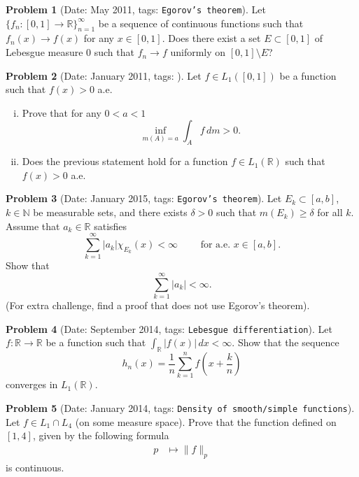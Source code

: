 \documentclass[11pt, notitlepage]{article}
\theoremstyle{definition}
\theoremstyle{definition}
\theoremstyle{definition}
\newtheorem{probstate}{Problem}
\theoremstyle{remark}
\newenvironment{problem}[2]{
    \begin{probstate}[Date: #1, tags: \texttt{#2}]
}
{
  \end{probstate}
}
\newcommand{\R}{\mathbb{R}}
\begin{document}
\begin{problem}{May 2011}{Egorov's theorem}
  Let $\{f_n: [0,1] \to \R\}_{n=1}^\infty$ be a sequence of continuous functions
     such that $f_n(x) \to f(x)$ for any $x \in [0,1]$. Does there
     exist a set $E \subset [0,1]$ of Lebesgue measure 0 such that
     $f_n \to f$ uniformly on $[0,1] \setminus E$?
\end{problem}

\begin{problem}{January 2011}{}
  Let $f \in L_1([0,1])$ be a function such that $f(x)>0$ a.e.
 \begin{enumerate}[(i)]
 \item Prove that for any $0<a<1$
 \[
   \inf_{m(A)=a} \int_A f \, dm >0.
 \]
 \item Does the previous statement hold for a function $f \in L_1(\mathbb R)$ such that $f(x)>0$ a.e.
 \end{enumerate}
\end{problem}

\begin{problem}{January 2015}{Egorov's theorem}
Let $E_k\subset [a,b]$, $k\in\mathbb N$ be measurable sets, and there exists $\delta>0$ such that $m(E_k)\ge \delta$ for all $k$.
 Assume that $a_k\in\mathbb R$ satisfies
$$\sum_{k=1}^\infty |a_k|\chi_{E_k}(x)<\infty\qquad \text{ for a.e. }  x\in [a,b].$$
Show that
$$\sum_{k=1}^\infty |a_k|<\infty.$$
(For extra challenge, find a proof that does not use Egorov's theorem).
\end{problem}

\begin{problem}{September 2014}{Lebesgue differentiation}
Let  $f: \R \to \R$ be a function such that $\int_{\R} |f(x)| \, dx < \infty$. Show that the sequence
\[
 h_n(x)=\frac{1}{n} \sum_{k=1}^n f \left(x+ \frac{k}{n} \right)
\]
converges in $L_1(\R)$.
\end{problem}

\begin{problem}{January 2014}{Density of smooth/simple functions}
Let $f\in L_1\cap L_4$ (on some measure space).  Prove that the function defined on $[1,4]$, given by the following formula
\begin{align*}
p & \mapsto \|f\|_p
\end{align*}
 is continuous.
\end{problem}
\end{document}
